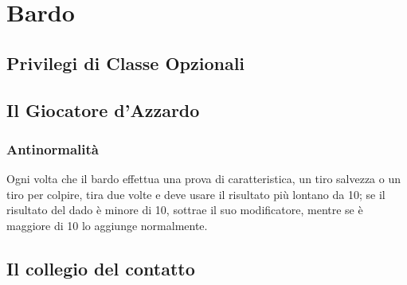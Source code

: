 \chapter{Bardo}

\section{Privilegi di Classe Opzionali}

\section{Il Giocatore d'Azzardo}

\subsection{Antinormalità}

Ogni volta che il bardo effettua una prova di caratteristica, un tiro salvezza o un tiro per colpire, tira due volte e deve usare il risultato più lontano da 10; se il risultato del dado è minore di 10, sottrae il suo modificatore, mentre se è maggiore di 10 lo aggiunge normalmente.

\section{Il collegio del contatto}

\begin{DndReadAloud}

\end{DndReadAloud}

\subsection{}
